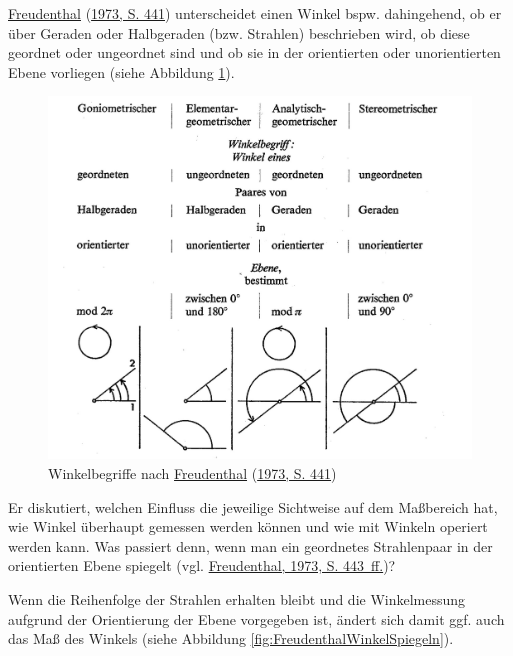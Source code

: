 \documentclass[
  ngerman,
]{scrbook}
\theoremstyle{definition}
\theoremstyle{definition}
\theoremstyle{definition}
\theoremstyle{definition}
\theoremstyle{remark}
\begin{document}
\protect\hyperlink{ref-Freudenthal:1973}{Freudenthal} (\protect\hyperlink{ref-Freudenthal:1973}{1973, S. 441}) unterscheidet einen Winkel bspw. dahingehend, ob er über Geraden oder Halbgeraden (bzw. Strahlen) beschrieben wird, ob diese geordnet oder ungeordnet sind und ob sie in der orientierten oder unorientierten Ebene vorliegen (siehe Abbildung \ref{fig:FreudenthalWinkel}).



\begin{figure}

{\centering \includegraphics[width=0.75\linewidth]{pictures/2-FreudenthalWinkel} 

}

\caption{Winkelbegriffe nach \protect\hyperlink{ref-Freudenthal:1973}{Freudenthal} (\protect\hyperlink{ref-Freudenthal:1973}{1973, S. 441})}\label{fig:FreudenthalWinkel}
\end{figure}

Er diskutiert, welchen Einfluss die jeweilige Sichtweise auf dem Maßbereich hat, wie Winkel überhaupt gemessen werden können und wie mit Winkeln operiert werden kann. Was passiert denn, wenn man ein geordnetes Strahlenpaar in der orientierten Ebene spiegelt (vgl. \protect\hyperlink{ref-Freudenthal:1973}{Freudenthal, 1973, S. 443~ff.})?

Wenn die Reihenfolge der Strahlen erhalten bleibt und die Winkelmessung aufgrund der Orientierung der Ebene vorgegeben ist, ändert sich damit ggf. auch das Maß des Winkels (siehe Abbildung \ref{fig:FreudenthalWinkelSpiegeln}).
\end{document}
